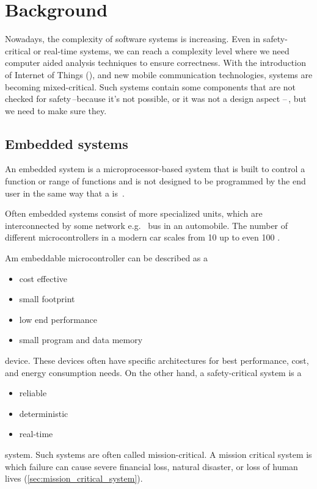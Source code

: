 
\chapter{Background}
\label{ch:background}

Nowadays, the complexity of software systems is increasing. Even in safety-critical or real-time systems, we can reach a complexity level where we need computer aided analysis techniques to ensure correctness. With the introduction of Internet of Things (\iot), and new mobile communication technologies, systems are becoming mixed-critical. Such systems contain some components that are not checked for safety\,--because it's not possible, or it was not a design aspect --\,, but we need to make sure they.

\section{Embedded systems}

An embedded system is a microprocessor-based system that is built to control a function or range of functions and is not designed to be programmed by the end user in the same way that a  is~\cite{heath2002embedded}.

Often embedded systems consist of more specialized units, which are interconnected by some network e.g.\  bus in an automobile. The number of different microcontrollers in a modern car scales from 10 up to even 100 \citep{VEHICLE_DYN}.

Am embeddable microcontroller can be described as a
\begin{itemize}
	\item cost effective
	\item small footprint
	\item low end performance
	\item small program and data memory
\end{itemize}
device. These devices often have specific architectures for best performance, cost, and energy consumption needs.
\needspace{5em}
\noindent On the other hand, a safety-critical system is a
\begin{itemize}
	\item reliable
	\item deterministic
	\item real-time
\end{itemize}
system. Such systems are often called mission-critical. A mission critical system is which failure can cause severe financial loss, natural disaster, or loss of human lives (\cref{sec:mission_critical_system}).

